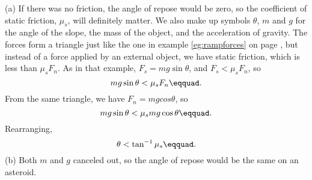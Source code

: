 (a) If there was no friction, the angle of repose would
be zero, so the coefficient of static friction, $\mu_s$, will
definitely matter. We also make up symbols $\theta$, $m$ and $g$ for
the angle of the slope, the mass of the object, and the
acceleration of gravity. The forces form a triangle just
like the one in example \ref{eg:rampforces}
 on page \pageref{eg:rampforces}, but instead of a force applied
by an external object, we have static friction, which is
less than $\mu_sF_n$. As in that example, $F_s=mg \sin \theta$, and
$F_s<\mu_s F_n$, so
\begin{equation*}
	mg \sin \theta<\mu_sF_n\eqquad.
\end{equation*}
From the same triangle, we have $F_n=mg cos \theta$, so
\begin{equation*}
	mg \sin \theta < \mu_s mg \cos \theta\eqquad.
\end{equation*}
Rearranging,
\begin{equation*}
	\theta < \tan^{-1} \mu_s\eqquad.
\end{equation*}
(b) Both $m$ and $g$ canceled out, so the angle of repose would
be the same on an asteroid.
